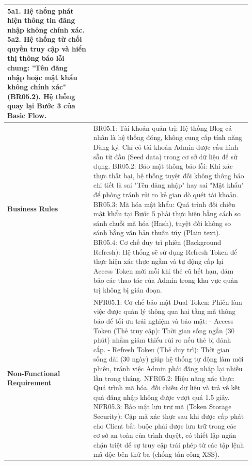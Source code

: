 \documentclass[a4paper,12pt]{article}
\begin{document}
\begin{longtable}{|p{4cm}|p{11.5cm}|}
5a1. Hệ thống phát hiện thông tin đăng nhập không chính xác. \newline
5a2. Hệ thống từ chối quyền truy cập và hiển thị thông báo lỗi chung: "Tên đăng nhập hoặc mật khẩu không chính xác" (BR05.2). \newline
Hệ thống quay lại Bước 3 của Basic Flow. \\ \hline
\textbf{Business Rules} & 
BR05.1: Tài khoản quản trị: Hệ thống Blog cá nhân là hệ thống đóng, không cung cấp tính năng Đăng ký. Chỉ có tài khoản Admin được cấu hình sẵn từ đầu (Seed data) trong cơ sở dữ liệu để sử dụng. \newline
BR05.2: Bảo mật thông báo lỗi: Khi xác thực thất bại, hệ thống tuyệt đối không thông báo chi tiết là sai "Tên đăng nhập" hay sai "Mật khẩu" để phòng tránh rủi ro kẻ gian dò quét tài khoản. \newline
BR05.3: Mã hóa mật khẩu: Quá trình đối chiếu mật khẩu tại Bước 5 phải thực hiện bằng cách so sánh chuỗi mã hóa (Hash), tuyệt đối không so sánh bằng văn bản thuần túy (Plain text). \newline
BR05.4: Cơ chế duy trì phiên (Background Refresh): Hệ thống sẽ sử dụng Refresh Token để thực hiện xác thực ngầm và tự động cấp lại Access Token mới mỗi khi thẻ cũ hết hạn, đảm bảo các thao tác của Admin trong khu vực quản trị không bị gián đoạn. \\ \hline
\textbf{Non-Functional Requirement} & 
NFR05.1: Cơ chế bảo mật Dual-Token: Phiên làm việc được quản lý thông qua hai tầng mã thông báo để tối ưu trải nghiệm và bảo mật: \newline
- Access Token (Thẻ truy cập): Thời gian sống ngắn (30 phút) nhằm giảm thiểu rủi ro nếu thẻ bị đánh cắp. \newline
- Refresh Token (Thẻ duy trì): Thời gian sống dài (30 ngày) giúp hệ thống tự động làm mới phiên, tránh việc Admin phải đăng nhập lại nhiều lần trong tháng. \newline
NFR05.2: Hiệu năng xác thực: Quá trình mã hóa, đối chiếu dữ liệu và trả về kết quả đăng nhập không được vượt quá 1.5 giây. \newline
NFR05.3: Bảo mật lưu trữ mã (Token Storage Security): Cặp mã xác thực sau khi được cấp phát cho Client bắt buộc phải được lưu trữ trong các cơ sở an toàn của trình duyệt, có thiết lập ngăn chặn triệt để sự truy cập trái phép từ các tập lệnh mã độc bên thứ ba (chống tấn công XSS). \\ \hline
\end{longtable}
\end{document}
